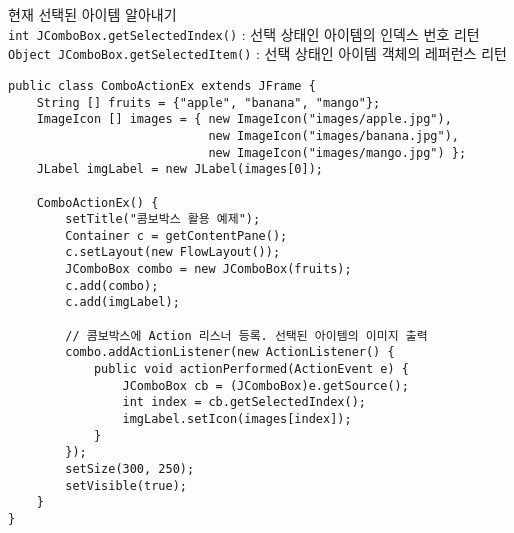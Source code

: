 현재 선택된 아이템 알아내기\\
\texttt{int JComboBox.getSelectedIndex()}
: 선택 상태인 아이템의 인덱스 번호 리턴\\
\texttt{Object JComboBox.getSelectedItem()}
: 선택 상태인 아이템 객체의 레퍼런스 리턴\\

\begin{verbatim}
public class ComboActionEx extends JFrame {
    String [] fruits = {"apple", "banana", "mango"};
    ImageIcon [] images = { new ImageIcon("images/apple.jpg"),
                            new ImageIcon("images/banana.jpg"),
                            new ImageIcon("images/mango.jpg") };
    JLabel imgLabel = new JLabel(images[0]);

    ComboActionEx() {
        setTitle("콤보박스 활용 예제");
        Container c = getContentPane();
        c.setLayout(new FlowLayout());
        JComboBox combo = new JComboBox(fruits);
        c.add(combo);
        c.add(imgLabel);

        // 콤보박스에 Action 리스너 등록. 선택된 아이템의 이미지 출력
        combo.addActionListener(new ActionListener() {
            public void actionPerformed(ActionEvent e) {
                JComboBox cb = (JComboBox)e.getSource();
                int index = cb.getSelectedIndex();
                imgLabel.setIcon(images[index]);
            }
        });
        setSize(300, 250);
        setVisible(true);
    }
}
\end{verbatim}

